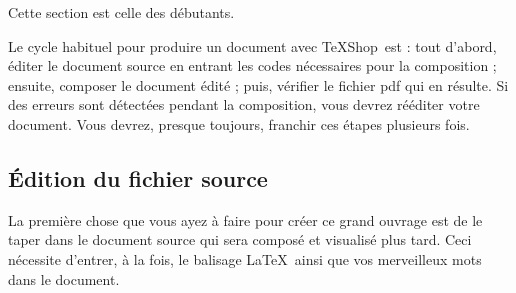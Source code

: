 \documentclass[11pt,french]{article}
\newcommand{\TS}{\textsf{\TeX Shop}}
\newcommand{\cmd}[1]{\textsf{#1}}
\begin{document}
%

Cette section est celle des débutants.

Le cycle habituel pour produire un document avec \TS\ est : tout d'abord, éditer le document source en entrant les codes nécessaires pour la composition ; ensuite, composer le document édité ; puis, vérifier le fichier \cmd{pdf} qui en résulte. Si des erreurs sont détectées pendant la composition, vous devrez rééditer votre document. Vous devrez, presque toujours, franchir ces étapes plusieurs fois.

\subsection{Édition du fichier source}

La première chose que vous ayez à faire pour créer ce grand ouvrage est de le taper dans le document source qui sera composé et visualisé plus tard. Ceci nécessite d'entrer, à la fois, le balisage \LaTeX\ ainsi que vos merveilleux mots dans le document.

\end{document}
